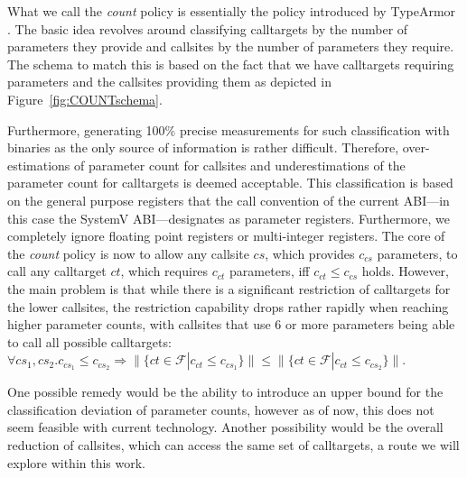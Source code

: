 What we call the \emph{count} policy is essentially the policy introduced by TypeArmor \cite{veen:typearmor}. 
The basic idea revolves around classifying calltargets by the number of parameters they provide and callsites 
by the number of parameters they require. The schema to match this is based on the fact that we  
have calltargets requiring parameters and the callsites providing them as depicted in Figure~\ref{fig:COUNTschema}.

Furthermore, generating 100\% precise measurements for such classification with binaries as the only source of information is rather difficult. 
Therefore, over-estimations of parameter count for callsites and underestimations of the parameter count for calltargets is deemed acceptable. 
This classification is based on the general purpose registers that the call convention of the current ABI---in this case the 
SystemV ABI---designates as parameter registers. Furthermore, we completely ignore floating point registers or multi-integer registers. 
The core of the \emph{count} policy is now to allow any callsite $cs$, which provides $c_{cs}$ parameters, to call any calltarget $ct$, 
which requires $c_{ct}$ parameters, iff $c_{ct} \leq c_{cs}$ holds. However, the main problem is that while there is a significant 
restriction of calltargets for the lower callsites, the restriction capability drops rather rapidly when reaching higher parameter 
counts, with callsites that use 6 or more parameters being able to call all possible calltargets:
$\forall cs_1, cs_2.  c_{cs_1} \leq c_{cs_2} \Longrightarrow  \| \{ct \in \mathcal{F} | c_{ct} \leq c_{cs_1} \} \| \leq \| \{ct \in \mathcal{F} | c_{ct} \leq c_{cs_2}  \} \|$.

One possible remedy would be the ability to introduce an upper bound for the classification deviation of parameter counts, 
however as of now, this does not seem feasible with current technology. Another possibility would be the overall reduction
of callsites, which can access the same set of calltargets, a route we will explore within this work.

